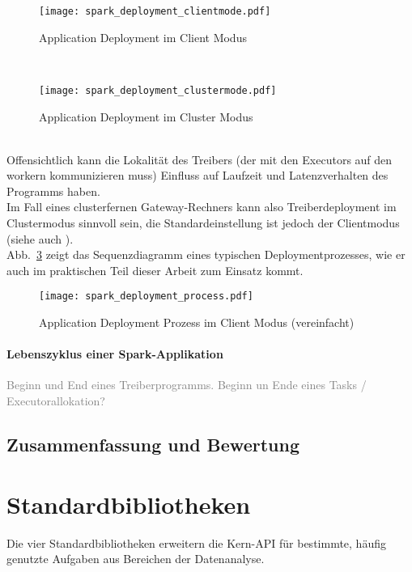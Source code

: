 \begin{figure}[ht!]
	\centering
  \texttt{[image: spark\_deployment\_clientmode.pdf]}
	\caption{Application Deployment im Client Modus}
	\label{fig:spark_deployment_clientmode}
\end{figure}\\

\begin{figure}[ht!]
	\centering
  \texttt{[image: spark\_deployment\_clustermode.pdf]}
	\caption{Application Deployment im Cluster Modus}
	\label{fig:spark_deployment_clustermode}
\end{figure}\\

Offensichtlich kann die Lokalität des Treibers (der mit den Executors auf den \gls{worker}n kommunizieren muss) Einfluss auf Laufzeit und Latenzverhalten des Programms haben.\\

Im Fall eines clusterfernen Gateway-Rechners kann also Treiberdeployment im Clustermodus sinnvoll sein, die Standardeinstellung ist jedoch der Clientmodus (siehe auch \cite{spark_submission}).\\

Abb.~\ref{fig:app_deployment_process} zeigt das Sequenzdiagramm eines typischen Deploymentprozesses, wie er auch im praktischen Teil dieser Arbeit zum Einsatz kommt.

\begin{figure}[ht!]
	\centering
  \texttt{[image: spark\_deployment\_process.pdf]}
	\caption{Application Deployment Prozess im Client Modus (vereinfacht)}
	\label{fig:app_deployment_process}
\end{figure}

\paragraph{Lebenszyklus einer Spark-Applikation}

\textcolor{gray}{Beginn und End eines Treiberprogramms. Beginn un Ende eines Tasks / Executorallokation?}\\

\subsection{Zusammenfassung und Bewertung}

\section{Standardbibliotheken}
Die vier Standardbibliotheken erweitern die Kern-API für bestimmte, häufig genutzte Aufgaben aus Bereichen der Datenanalyse.\\

